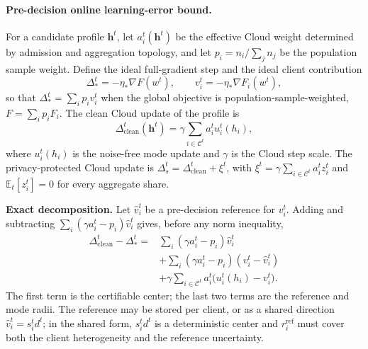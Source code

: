 \documentclass[5p,times]{elsarticle}
\theoremstyle{plain}
\theoremstyle{definition}
\theoremstyle{remark}
\begin{document}
\paragraph{Pre-decision online learning-error bound.}
For a candidate profile $\mathbf h^t$, let
$a_i^t(\mathbf h^t)$ be the effective Cloud weight determined by
admission and aggregation topology, and let
$p_i=n_i/\sum_jn_j$ be the population sample weight.
Define the ideal full-gradient step and the ideal client
contribution
\begin{equation}
\Delta_*^t=-\eta_*\nabla F(w^t),
\qquad
v_i^t=-\eta_*\nabla F_i(w^t),
\label{eq:app_ideal_steps}
\end{equation}
so that $\Delta_*^t=\sum_i p_iv_i^t$ when the global objective is
population-sample-weighted, $F=\sum_i p_iF_i$.
The clean Cloud update of the profile is
\begin{equation}
\Delta_{\mathrm{clean}}^t(\mathbf h^t)
=\gamma\sum_{i\in\mathcal C^t}a_i^tu_i^t(h_i),
\label{eq:app_clean_update}
\end{equation}
where $u_i^t(h_i)$ is the noise-free mode update and $\gamma$ is the
Cloud step scale. The privacy-protected Cloud update is
$\Delta_s^t=\Delta_{\mathrm{clean}}^t+\xi^t$, with
$\xi^t=\gamma\sum_{i\in\mathcal C^t}a_i^tz_i^t$ and
$\mathbb E_t[z_i^t]=0$ for every aggregate share.

\textbf{Exact decomposition.}
Let $\hat v_i^t$ be a pre-decision reference for $v_i^t$. Adding and
subtracting $\sum_i(\gamma a_i^t-p_i)\hat v_i^t$ gives, before any norm
inequality,
\begin{equation}
\begin{aligned}
\Delta_{\mathrm{clean}}^t-\Delta_*^t
={}&
\sum_i(\gamma a_i^t-p_i)\hat v_i^t\\
&+\sum_i(\gamma a_i^t-p_i)(v_i^t-\hat v_i^t)\\
&+\gamma\sum_{i\in\mathcal C^t}a_i^t
\bigl(u_i^t(h_i)-v_i^t\bigr).
\end{aligned}
\label{eq:app_online_identity}
\end{equation}
The first term is the certifiable center; the last two terms are the
reference and mode radii. The reference may be stored per client, or as
a shared direction $\hat v_i^t=s_i^td^t$; in the shared form,
$s_i^td^t$ is a deterministic center and $r_i^{\mathrm{ref}}$ must
cover both the client heterogeneity and the reference uncertainty.
\end{document}
